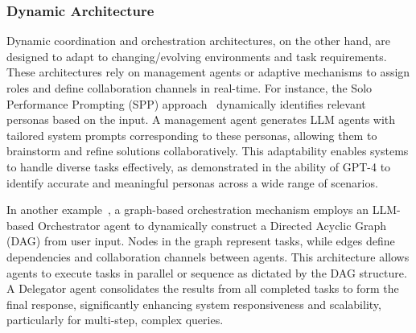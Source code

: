 \documentclass[acmsmall,nonacm]{acmart}
\begin{document}
	\subsubsection{Dynamic Architecture}
            Dynamic coordination and orchestration architectures, on the other hand, are designed to adapt to changing/evolving environments and task requirements. These architectures rely on management agents or adaptive mechanisms to assign roles and define collaboration channels in real-time. For instance, the Solo Performance Prompting (SPP) approach~\cite{wang-etal-2024-unleashing} dynamically identifies relevant personas based on the input. A management agent generates LLM agents with tailored system prompts corresponding to these personas, allowing them to brainstorm and refine solutions collaboratively. This adaptability enables systems to handle diverse tasks effectively, as demonstrated in the ability of GPT-4 to identify accurate and meaningful personas across a wide range of scenarios.
    
            In another example~\cite{jeyakumar2024advancing}, a graph-based orchestration mechanism employs an LLM-based Orchestrator agent to dynamically construct a Directed Acyclic Graph (DAG) from user input. Nodes in the graph represent tasks, while edges define dependencies and collaboration channels between agents. This architecture allows agents to execute tasks in parallel or sequence as dictated by the DAG structure. A Delegator agent consolidates the results from all completed tasks to form the final response, significantly enhancing system responsiveness and scalability, particularly for multi-step, complex queries.
\end{document}
